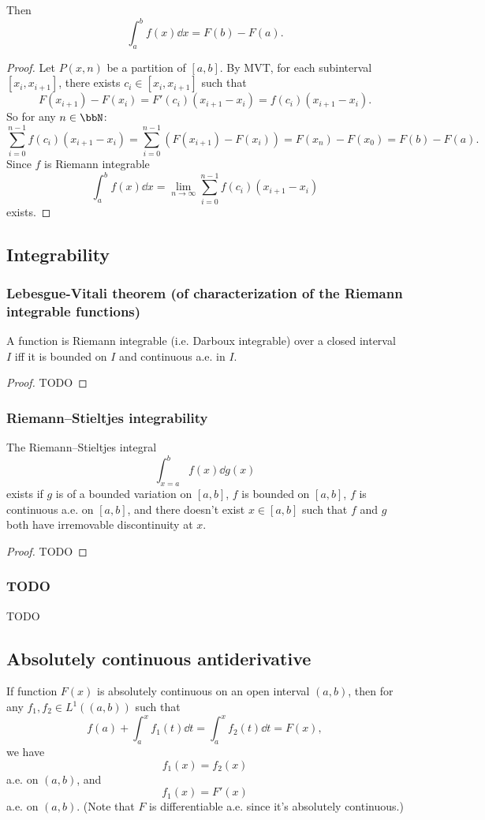 \documentclass[a4paper,12pt]{report}
\begin{document}
\begin{itemize}
\begin{itemize}
Then
\[\int_a^bf(x)\dd{x}=F(b)-F(a).\]
\begin{proof}
Let $P(x,n)$ be a partition of $[a,b]$. By MVT, for each subinterval $[x_i,x_{i+1}]$, there exists $c_i\in[x_i,x_{i+1}]$ such that
\[F(x_{i+1})-F(x_i)=F'(c_i)(x_{i+1}-x_i)=f(c_i)(x_{i+1}-x_i).\]
So for any $n\in\bbN$:
\[\sum_{i=0}^{n-1}f(c_i)(x_{i+1}-x_i)=\sum_{i=0}^{n-1}(F(x_{i+1})-F(x_i))=F(x_n)-F(x_0)=F(b)-F(a).\]
Since $f$ is Riemann integrable
\[\int_a^bf(x)\dd{x}=\lim_{n\to\infty}\sum_{i=0}^{n-1}f(c_i)(x_{i+1}-x_i)\]
exists.
\end{proof}
\subsection{Integrability}
\subsubsection{Lebesgue-Vitali theorem (of characterization of the Riemann integrable functions)}
A function is Riemann integrable (i.e. Darboux integrable) over a closed interval $I$ iff it is bounded on $I$ and continuous a.e. in $I$.
\begin{proof}
TODO
\end{proof}
\subsubsection{Riemann–Stieltjes integrability}
The Riemann–Stieltjes integral
\[\int_{x=a}^bf(x)\dd{g(x)}\]
exists if $g$ is of a bounded variation on $[a,b]$, $f$ is bounded on $[a,b]$, $f$ is continuous a.e. on $[a,b]$, and there doesn't exist $x\in[a,b]$ such that $f$ and $g$ both have irremovable discontinuity at $x$.
\begin{proof}
TODO
\end{proof}
\subsubsection{TODO}
TODO
\subsection{Absolutely continuous antiderivative}
If function $F(x)$ is absolutely continuous on an open interval $(a,b)$, then for any $f_1,f_2\in L^1((a,b))$ such that
\[f(a)+\int_a^xf_1(t)\dd{t}=\int_a^xf_2(t)\dd{t}=F(x),\]
we have
\[f_1(x)=f_2(x)\]
a.e. on $(a,b)$, and
\[f_1(x)=F'(x)\]
a.e. on $(a,b)$. (Note that $F$ is differentiable a.e. since it's absolutely continuous.)

\end{itemize}
\end{itemize}
\end{document}
